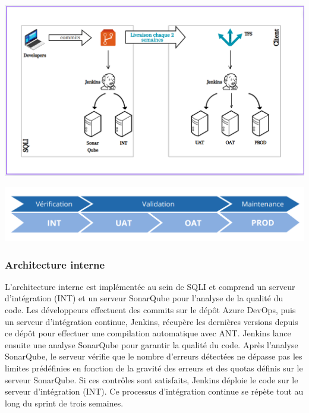 \begin{center}
    \centering
    \includegraphics[width=19cm]{Figures/Test.png}
    \label{fig:processus}
\end{center}
\begin{center}
    \centering
    \includegraphics[width=19cm]{Figures/UAT.png}
    \label{fig:processus}
\end{center}



\subsubsection{Architecture interne}
L'architecture interne est implémentée au sein de SQLI et comprend un serveur d'intégration (INT) et un serveur SonarQube pour l'analyse de la qualité du code. Les développeurs effectuent des commits sur le dépôt Azure DevOps, puis un serveur d'intégration continue, Jenkins, récupère les dernières versions depuis ce dépôt pour effectuer une compilation automatique avec ANT. Jenkins lance ensuite une analyse SonarQube pour garantir la qualité du code. Après l'analyse SonarQube, le serveur vérifie que le nombre d'erreurs détectées ne dépasse pas les limites prédéfinies en fonction de la gravité des erreurs et des quotas définis sur le serveur SonarQube. Si ces contrôles sont satisfaits, Jenkins déploie le code sur le serveur d'intégration (INT). Ce processus d'intégration continue se répète tout au long du sprint de trois semaines.


